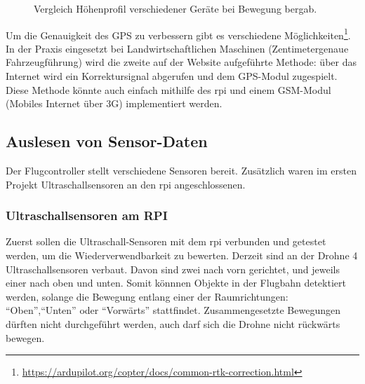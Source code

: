 \begin{figure}[h!]
    \centering
            
    \caption{Vergleich Höhenprofil verschiedener Geräte bei Bewegung bergab.}
    \label{fig:bench_gps_elevation}
\end{figure}

Um die Genauigkeit des GPS zu verbessern gibt es verschiedene Möglichkeiten\footnote{\url{https://ardupilot.org/copter/docs/common-rtk-correction.html}}. In der Praxis eingesetzt bei Landwirtschaftlichen Maschinen (Zentimetergenaue Fahrzeugführung) wird die zweite auf der Website aufgeführte Methode: über das Internet wird ein Korrektursignal abgerufen und dem GPS-Modul zugespielt. Diese Methode könnte auch einfach mithilfe des \gls{rpi} und einem GSM-Modul (Mobiles Internet über 3G) implementiert werden.

\subsection{Auslesen von Sensor-Daten}
Der Flugcontroller stellt verschiedene Sensoren bereit. Zusätzlich waren im ersten Projekt Ultraschallsensoren an den \gls{rpi} angeschlossenen. 

\subsubsection{Ultraschallsensoren am RPI}
Zuerst sollen die Ultraschall-Sensoren mit dem \gls{rpi} verbunden und getestet werden, um die Wiederverwendbarkeit zu bewerten. Derzeit sind an der Drohne 4 Ultraschallsensoren verbaut. Davon sind zwei nach vorn gerichtet, und jeweils einer nach oben und unten. Somit könnnen Objekte in der Flugbahn detektiert werden, solange die Bewegung entlang einer der Raumrichtungen: \enquote{Oben},\enquote{Unten} oder \enquote{Vorwärts} stattfindet. Zusammengesetzte Bewegungen dürften nicht durchgeführt werden, auch darf sich die Drohne nicht rückwärts bewegen.


